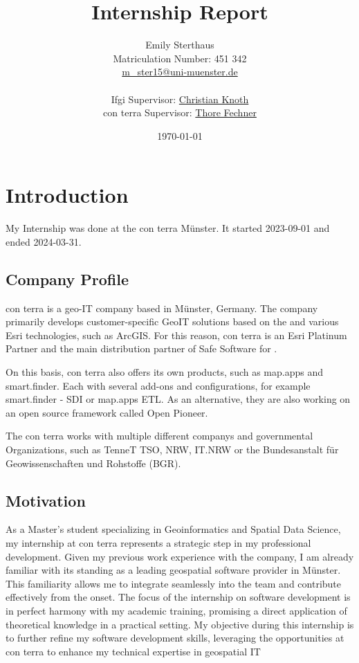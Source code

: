 \documentclass[11pt, titlepage, a4paper]{article}
\title{Internship Report}
\author{Emily Sterthaus \\ Matriculation Number: 451 342 \\ \href{mailto:m_ster15@uni-muenster.de}{m\_ster15@uni-muenster.de}\\ \\
\small Ifgi Supervisor: \href{mailto:christian.knoth@uni-muenster.de}{Christian Knoth}\\ \small con terra Supervisor: \href{mailto:t.fechner@conterra.de}{Thore Fechner}
}
\date{\today}
\begin{document}
\maketitle
\newpage
\tableofcontents
\newpage

\section{Introduction}

My Internship was done at the con terra Münster. It started 2023-09-01 and ended 2024-03-31.
\subsection{Company Profile}
con terra is a geo-IT company based in Münster, Germany. The company primarily develops customer-specific GeoIT solutions based on the  and various Esri technologies, such as ArcGIS. For this reason, con terra is an Esri Platinum Partner and the main distribution partner of Safe Software for .

On this basis, con terra also offers its own products, such as map.apps and smart.finder. Each with several add-ons and configurations, for example smart.finder - SDI or map.apps ETL. As an alternative, they are also working on an open source framework called Open Pioneer.  %

The con terra works with multiple different companys and governmental Organizations, such as TenneT TSO,   NRW, IT.NRW or the Bundesanstalt für Geowissenschaften und Rohstoffe  (BGR).

\subsection{Motivation}
As a Master’s student specializing in Geoinformatics and Spatial Data Science, my internship at con terra represents a strategic step in my professional development. Given my previous work experience with the company, I am already familiar with its standing as a leading geospatial software provider in Münster. This familiarity allows me to integrate seamlessly into the team and contribute effectively from the onset. The focus of the internship on software development is in perfect harmony with my academic training, promising a direct application of theoretical knowledge in a practical setting. My objective during this internship is to further refine my software development skills, leveraging the opportunities at con terra to enhance my technical expertise in geospatial IT
\end{document}
